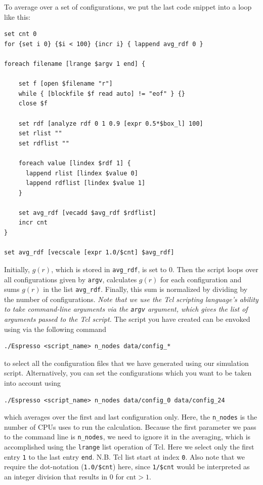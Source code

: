 \documentclass[
a4paper,                        %
11pt,                           %
twoside,                        %
footsepline,                    %
headsepline,                    %
headexclude,                    %
footexclude,                    %
pagesize,                       %
]{scrartcl}
\begin{document}
To average over a set of configurations, we put the last code snippet into a loop like this:

{\small\vspace{0,2cm}
\begin{lstlisting}[numbers=none]
set cnt 0
for {set i 0} {$i < 100} {incr i} { lappend avg_rdf 0 }

foreach filename [lrange $argv 1 end] {

    set f [open $filename "r"]
    while { [blockfile $f read auto] != "eof" } {}
    close $f

    set rdf [analyze rdf 0 1 0.9 [expr 0.5*$box_l] 100]
    set rlist ""
    set rdflist ""

    foreach value [lindex $rdf 1] {
      lappend rlist [lindex $value 0]
      lappend rdflist [lindex $value 1]
    }
    
    set avg_rdf [vecadd $avg_rdf $rdflist]
    incr cnt
}

set avg_rdf [vecscale [expr 1.0/$cnt] $avg_rdf]
\end{lstlisting}\vspace{0,2cm}
}

\noindent Initially, $g(r)$, which is stored in \verb|avg_rdf|, is set to 0. Then the script loops over all configurations given by \verb|argv|, calculates $g(r)$ for each configuration and sums $g(r)$ in the list \verb|avg_rdf|. Finally, this sum is normalized by dividing by the number of configurations. \emph{Note that we use the Tcl scripting language's ability to take command-line arguments via the \texttt{argv} argument, which gives the list of arguments passed to the Tcl script.} The script you have created can be envoked using \es{} via the following command 
\begin{verbatim}
./Espresso <script_name> n_nodes data/config_*
\end{verbatim}
to select all the configuration files that we have generated using our simulation script. Alternatively, you can set the configurations which you want to be taken into account using 
\begin{verbatim}
./Espresso <script_name> n_nodes data/config_0 data/config_24
\end{verbatim}
which averages over the first and last configuration only. Here, the \verb|n_nodes| is the number of CPUs \es{} uses to run the calculation. Because the first parameter we pass to the command line is \verb|n_nodes|, we need to ignore it in the averaging, which is accomplished using the \verb|lrange| list operation of Tcl. Here we select only the first entry \texttt{1} to the last entry \texttt{end}. N.B. Tcl list start at index \texttt{0}. Also note that we require the dot-notation (\texttt{1.0/\$cnt}) here, since \texttt{1/\$cnt} would be interpreted as an integer division that results in 0 for $\text{cnt}>1$. 
\end{document}
